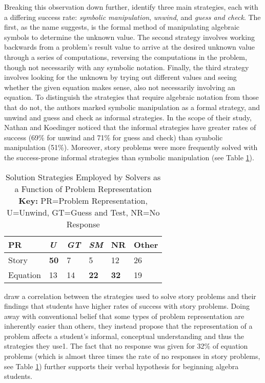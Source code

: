 \documentclass[10pt,letterpaper]{article}
\begin{document}
Breaking this observation down further,  identify three main strategies, each with a differing success rate: \textit{symbolic manipulation}, \textit{unwind}, and \textit{guess and check}. The first, as the name suggests, is the formal method of manipulating algebraic symbols to determine the unknown value. The second strategy involves working backwards from a problem's result value to arrive at the desired unknown value through a series of computations, reversing the computations in the problem, though not necessarily with any symbolic notation. Finally, the third strategy involves looking for the unknown by trying out different values and seeing whether the given equation makes sense, also not necessarily involving an equation. To distinguish the strategies that require algebraic notation from those that do not, the authors marked symbolic manipulation as a formal strategy, and unwind and guess and check as informal strategies. In the scope of their study, Nathan and Koedinger noticed that the informal strategies have greater rates of success (69\% for unwind and 71\% for guess and check) than symbolic manipulation (51\%). Moreover, story problems were more frequently solved with the success-prone informal strategies than symbolic manipulation (see Table \ref{strategies_employed}). 
\begin{table}[!ht]
\begin{center} 
\caption{Solution Strategies Employed by Solvers as a Function of Problem Representation \cite{KoedNath2004}\\ \textbf{Key:} PR=Problem Representation, U=Unwind, GT=Guess and Test, NR=No Response} 
\label{strategies_employed} 
\vskip 0.12in
\begin{tabular}{llllll} 
\hline
PR    &  \textit{U} & \textit{GT} & \textit{SM} & NR & Other \\
\hline
Story        &   \textbf{50} & 7 & 5 & 12 & 26\\
Equation   &   13 & 14 & \textbf{22} & \textbf{32} & 19 \\
\hline
\end{tabular} 
\end{center} 
\end{table}

 draw a correlation between the strategies used to solve story problems and their findings that students have higher rates of success with story problems. Doing away with conventional belief that some types of problem representation are inherently easier than others, they instead propose that the representation of a problem affects a student's informal, conceptual understanding and thus the strategies they use1. The fact that no response was given for 32\% of equation problems (which is almost three times the rate of no responses in story problems, see Table \ref{strategies_employed}) further supports their verbal hypothesis for beginning algebra students.
\end{document}
